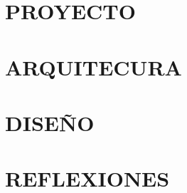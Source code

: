 \documentclass[11pt]{book}
\begin{document}
\tableofcontents
\listoffigures

\part{PROYECTO}


\part{ARQUITECURA}








\part{DISEÑO}
%

%
%

\part{REFLEXIONES}




\end{document}

